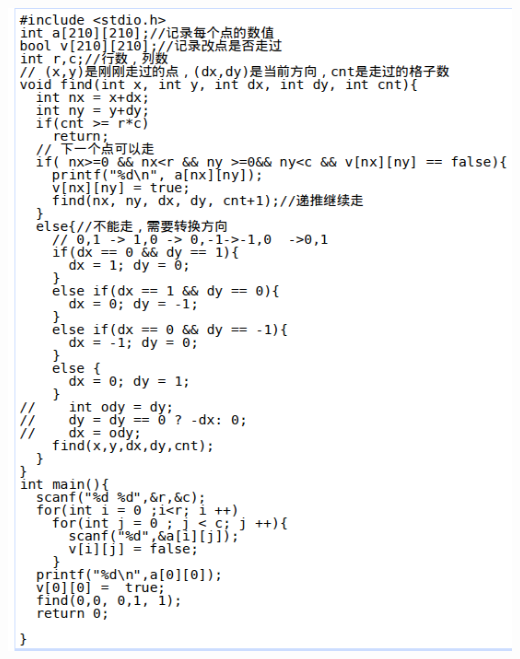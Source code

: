 \documentclass[color=usenames,dvipsnames]{beamer}
\begin{document}
{{\begin{columns}
     \column{0.55\hsize}
     \includegraphics[width=0.9\hsize]{pic/二维数组回形遍历-good2.png}
     \end{columns}
     }
}
\end{document}
